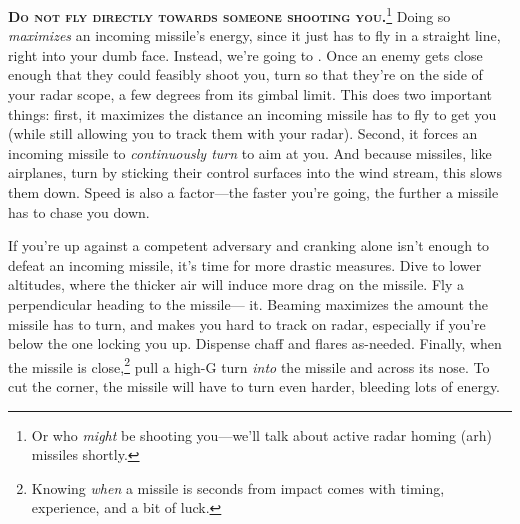\textbf{\textsc{Do not fly directly towards someone shooting
you.}}\punckern\footnote{Or who \emph{might} be shooting you---we'll talk about
active radar homing \ac{(arh)} missiles shortly.}
Doing so \emph{maximizes} an incoming missile's energy,
since it just has to fly in a straight line, right into your dumb face.
Instead, we're going to .
Once an enemy gets close enough that they could feasibly shoot you,
turn so that they're on the side of your radar scope,
a few degrees from its gimbal limit.
This does two important things:
first, it maximizes the distance an incoming missile has to fly to get you
(while still allowing you to track them with your radar).
Second, it forces an incoming missile to \emph{continuously turn} to
aim at you.
And because missiles, like airplanes, turn by sticking their control surfaces
into the wind stream, this slows them down.
Speed is also a factor---the faster you're going,
the further a missile has to chase you down.

If you're up against a competent adversary and cranking alone isn't enough to
defeat an incoming missile, it's time for more drastic measures.
Dive to lower altitudes, where the thicker air will induce more drag on
the missile. Fly a perpendicular heading to the missile--- it.
Beaming maximizes the amount the missile has to turn,
and makes you hard to track on radar,
especially if you're below the one locking you up.
Dispense chaff and flares as-needed.
Finally, when the missile is close,\punckern\footnote{Knowing \emph{when} a
missile is seconds from impact comes with timing, experience, and a bit of luck.}
pull a high-G turn \emph{into} the missile and across its nose.
To cut the corner, the missile will have to turn even harder,
bleeding lots of energy.

